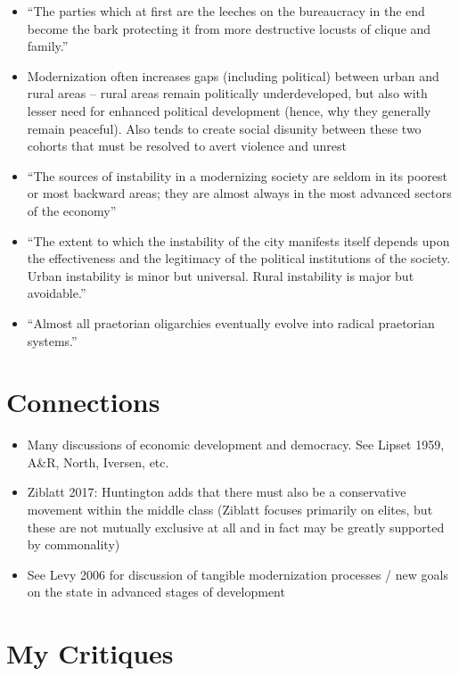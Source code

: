 \documentclass[12pt]{article}
\begin{document}
\begin{itemize}[leftmargin=*, itemsep=4pt]
    \item ``The parties which at first are the leeches on the bureaucracy in the end become the bark protecting it from more destructive locusts of clique and family.''
    \item Modernization often increases gaps (including political) between urban and rural areas -- rural areas remain politically underdeveloped, but also with lesser need for enhanced political development (hence, why they generally remain peaceful). Also tends to create social disunity between these two cohorts that must be resolved to avert violence and unrest
    \item ``The sources of instability in a modernizing society are seldom in its poorest or most backward areas; they are almost always in the most advanced sectors of the economy''
    \item ``The extent to which the instability of the city manifests itself depends upon the effectiveness and the legitimacy of the political institutions of the society. Urban instability is minor but universal. Rural instability is major but avoidable.''
    \item ``Almost all praetorian oligarchies eventually evolve into radical praetorian systems.''
\end{itemize}

\section{Connections}

\begin{itemize}
    \item Many discussions of economic development and democracy. See Lipset 1959, A\&R, North, Iversen, etc.
    \item Ziblatt 2017: Huntington adds that there must also be a conservative movement within the middle class (Ziblatt focuses primarily on elites, but these are not mutually exclusive at all and in fact may be greatly supported by commonality)
    \item See Levy 2006 for discussion of tangible modernization processes / new goals on the state in advanced stages of development
\end{itemize}

\section{My Critiques}
\end{document}
